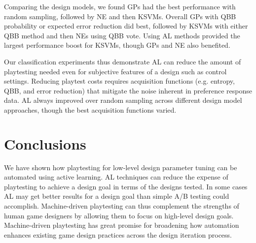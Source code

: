 \documentclass{sig-alternate}
\begin{document}
Comparing the design models, we found GPs had the best performance with random sampling, followed by NE and then KSVMs.
Overall GPs with QBB probability or expected error reduction did best, followed by KSVMs with either QBB method and then NEs using QBB vote.
Using AL methods provided the largest performance boost for KSVMs, though GPs and NE also benefited.


Our classification experiments thus demonstrate AL can reduce the amount of playtesting needed even for subjective features of a design such as control settings.
Reducing playtest costs requires acquisition functions (e.g. entropy, QBB, and error reduction) that mitigate the noise inherent in preference response data.
AL always improved over random sampling across different design model approaches, though the best acquisition functions varied.




\section{Conclusions}





We have shown how playtesting for low-level design parameter tuning can be automated using active learning.
AL techniques can reduce the expense of playtesting to achieve a design goal in terms of the designs tested.
In some cases AL may get better results for a design goal than simple A/B testing could accomplish.
Machine-driven playtesting can thus complement the strengths of human game designers by allowing them to focus on high-level design goals.
Machine-driven playtesting has great promise for broadening how automation enhances existing game design practices across the design iteration process.
\end{document}
